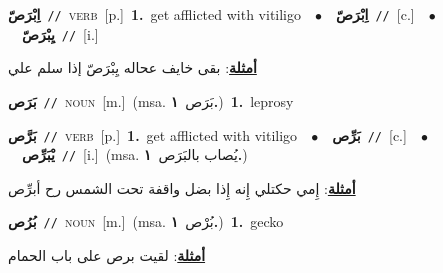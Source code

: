 \documentclass[10pt,a4paper,twoside]{article} %
\begin{document}
\begin{multicols}{2}
{\setlength\topsep{0pt}\textbf{\foreignlanguage{arabic}{اِبْرَصّ}}\ {\color{gray}\texttt{//}\color{black}}\ \textsc{verb}\ [p.]\ \textbf{1.}~get afflicted with vitiligo\ \ $\bullet$\ \ \setlength\topsep{0pt}\textbf{\foreignlanguage{arabic}{اِبْرَصّ}}\ {\color{gray}\texttt{//}\color{black}}\ [c.]\ \ $\bullet$\ \ \setlength\topsep{0pt}\textbf{\foreignlanguage{arabic}{يِبْرَصّ}}\ {\color{gray}\texttt{//}\color{black}}\ [i.]\  \begin{flushright}\color{gray}\foreignlanguage{arabic}{\textbf{\underline{\foreignlanguage{arabic}{أمثلة}}}: بقى خايف عحاله يِبْرَصّ إذا سلم علي}\end{flushright}\color{black}} \vspace{2mm}

{\setlength\topsep{0pt}\textbf{\foreignlanguage{arabic}{بَرَص}}\ {\color{gray}\texttt{//}\color{black}}\ \textsc{noun}\ [m.]\ \color{gray}(msa. \foreignlanguage{arabic}{بَرَص}~\foreignlanguage{arabic}{\textbf{١.}})\color{black}\ \textbf{1.}~leprosy\ } \vspace{2mm}

{\setlength\topsep{0pt}\textbf{\foreignlanguage{arabic}{بَرَّص}}\ {\color{gray}\texttt{//}\color{black}}\ \textsc{verb}\ [p.]\ \textbf{1.}~get afflicted with vitiligo\ \ $\bullet$\ \ \setlength\topsep{0pt}\textbf{\foreignlanguage{arabic}{بَرِّص}}\ {\color{gray}\texttt{//}\color{black}}\ [c.]\ \ $\bullet$\ \ \setlength\topsep{0pt}\textbf{\foreignlanguage{arabic}{يْبَرِّص}}\ {\color{gray}\texttt{//}\color{black}}\ [i.]\ \color{gray}(msa. \foreignlanguage{arabic}{يُصاب بالبَرَص}~\foreignlanguage{arabic}{\textbf{١.}})\color{black}\  \begin{flushright}\color{gray}\foreignlanguage{arabic}{\textbf{\underline{\foreignlanguage{arabic}{أمثلة}}}: إِمي حكتلي إِنه إِذا بضل واقفة تحت الشمس رح أبرِّص}\end{flushright}\color{black}} \vspace{2mm}

{\setlength\topsep{0pt}\textbf{\foreignlanguage{arabic}{بُرُص}}\ {\color{gray}\texttt{//}\color{black}}\ \textsc{noun}\ [m.]\ \color{gray}(msa. \foreignlanguage{arabic}{بُرْص}~\foreignlanguage{arabic}{\textbf{١.}})\color{black}\ \textbf{1.}~gecko\  \begin{flushright}\color{gray}\foreignlanguage{arabic}{\textbf{\underline{\foreignlanguage{arabic}{أمثلة}}}: لقيت برص على باب الحمام}\end{flushright}\color{black}} \vspace{2mm}


\end{multicols}
\end{document}
